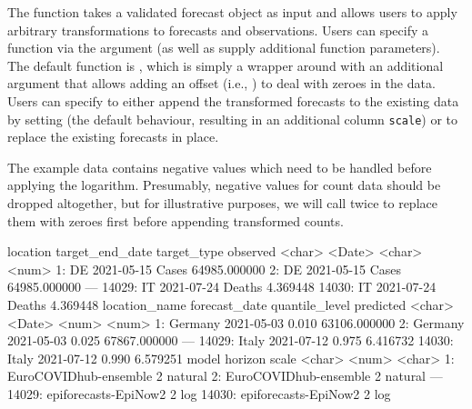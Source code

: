 \documentclass[
]{jss}
\begin{document}
The function  takes a validated forecast
object as input and allows users to apply arbitrary transformations to
forecasts and observations. Users can specify a function via the
argument  (as well as supply additional function parameters).
The default function is , which is simply a wrapper
around  with an additional argument that allows adding an
offset (i.e., ) to deal with zeroes in the data.
Users can specify to either append the transformed forecasts to the
existing data by setting  (the default behaviour,
resulting in an additional column \texttt{scale}) or to replace the
existing forecasts in place.

The example data contains negative values which need to be handled
before applying the logarithm. Presumably, negative values for count
data should be dropped altogether, but for illustrative purposes, we
will call  twice to replace them with
zeroes first before appending transformed counts.

\begin{CodeChunk}
\begin{CodeOutput}

       location target_end_date target_type     observed
         <char>          <Date>      <char>        <num>
    1:       DE      2021-05-15       Cases 64985.000000
    2:       DE      2021-05-15       Cases 64985.000000
   ---                                                  
14029:       IT      2021-07-24      Deaths     4.369448
14030:       IT      2021-07-24      Deaths     4.369448
       location_name forecast_date quantile_level    predicted
              <char>        <Date>          <num>        <num>
    1:       Germany    2021-05-03          0.010 63106.000000
    2:       Germany    2021-05-03          0.025 67867.000000
   ---                                                        
14029:         Italy    2021-07-12          0.975     6.416732
14030:         Italy    2021-07-12          0.990     6.579251
                       model horizon   scale
                      <char>   <num>  <char>
    1: EuroCOVIDhub-ensemble       2 natural
    2: EuroCOVIDhub-ensemble       2 natural
   ---                                      
14029:  epiforecasts-EpiNow2       2     log
14030:  epiforecasts-EpiNow2       2     log
\end{CodeOutput}
\end{CodeChunk}
\end{document}
